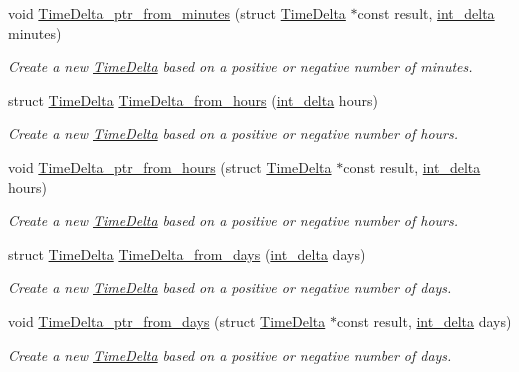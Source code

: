 \begin{DoxyCompactItemize}
void \hyperlink{time-delta_8h_a5c848849ba41c9eccd607992bebf29dd}{Time\-Delta\-\_\-ptr\-\_\-from\-\_\-minutes} (struct \hyperlink{structTimeDelta}{Time\-Delta} $\ast$const result, \hyperlink{types_8h_a8a67cf99971c5cfeeaa2380ba84a4c92}{int\-\_\-delta} minutes)
\begin{DoxyCompactList}\small\item\em Create a new \hyperlink{structTimeDelta}{Time\-Delta} based on a positive or negative number of minutes. \end{DoxyCompactList}\item 
struct \hyperlink{structTimeDelta}{Time\-Delta} \hyperlink{time-delta_8h_a56f1c443994cd0cbe306cd04e378eabe}{Time\-Delta\-\_\-from\-\_\-hours} (\hyperlink{types_8h_a8a67cf99971c5cfeeaa2380ba84a4c92}{int\-\_\-delta} hours)
\begin{DoxyCompactList}\small\item\em Create a new \hyperlink{structTimeDelta}{Time\-Delta} based on a positive or negative number of hours. \end{DoxyCompactList}\item 
void \hyperlink{time-delta_8h_a61ca1bb54ad8033fcae95986ff58b98d}{Time\-Delta\-\_\-ptr\-\_\-from\-\_\-hours} (struct \hyperlink{structTimeDelta}{Time\-Delta} $\ast$const result, \hyperlink{types_8h_a8a67cf99971c5cfeeaa2380ba84a4c92}{int\-\_\-delta} hours)
\begin{DoxyCompactList}\small\item\em Create a new \hyperlink{structTimeDelta}{Time\-Delta} based on a positive or negative number of hours. \end{DoxyCompactList}\item 
struct \hyperlink{structTimeDelta}{Time\-Delta} \hyperlink{time-delta_8h_a63cc9a37b13e1ea2c9517a15254761dd}{Time\-Delta\-\_\-from\-\_\-days} (\hyperlink{types_8h_a8a67cf99971c5cfeeaa2380ba84a4c92}{int\-\_\-delta} days)
\begin{DoxyCompactList}\small\item\em Create a new \hyperlink{structTimeDelta}{Time\-Delta} based on a positive or negative number of days. \end{DoxyCompactList}\item 
void \hyperlink{time-delta_8h_a8fbe0f084eda4cd4aa7e21e1f5cbaf55}{Time\-Delta\-\_\-ptr\-\_\-from\-\_\-days} (struct \hyperlink{structTimeDelta}{Time\-Delta} $\ast$const result, \hyperlink{types_8h_a8a67cf99971c5cfeeaa2380ba84a4c92}{int\-\_\-delta} days)
\begin{DoxyCompactList}\small\item\em Create a new \hyperlink{structTimeDelta}{Time\-Delta} based on a positive or negative number of days. \end{DoxyCompactList}\item 

\end{DoxyCompactItemize}
